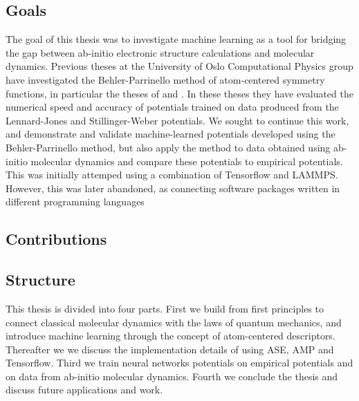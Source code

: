 \subsection{Goals}
The goal of this thesis was to investigate machine learning
as a tool for bridging the gap between ab-initio electronic structure
calculations and molecular dynamics. Previous theses at the University
of Oslo Computational Physics group have investigated the Behler-Parrinello
method of atom-centered symmetry functions, in particular the theses of
\parencite[Stende, John A,]{stende2017constructing} and
\parencite[Treider, H{\aa}kon Vik{\o}r]{treider2017speeding}.
In these theses they have evaluated the
numerical speed and accuracy of potentials trained on data
produced from the Lennard-Jones
and Stillinger-Weber potentials.
We sought to continue this work, and demonstrate and validate machine-learned
potentials developed using the Behler-Parrinello method, but also apply
the method to data obtained using ab-initio molecular dynamics
and compare these potentials to empirical potentials.
This was initially attemped using a combination of Tensorflow and LAMMPS.
However, this was later abandoned, as connecting software packages written
in different programming languages

\subsection{Contributions}

\subsection{Structure}
This thesis is divided into four parts. First we build from first principles
to connect classical molecular dynamics with the laws of quantum mechanics,
and introduce machine learning through the concept of atom-centered descriptors.
Thereafter we we discuss the implementation details of using
ASE, AMP and Tensorflow. Third we train neural networks potentials
on empirical potentials and on data from ab-initio molecular dynamics.
Fourth we conclude the thesis and discuss future applications and work.
